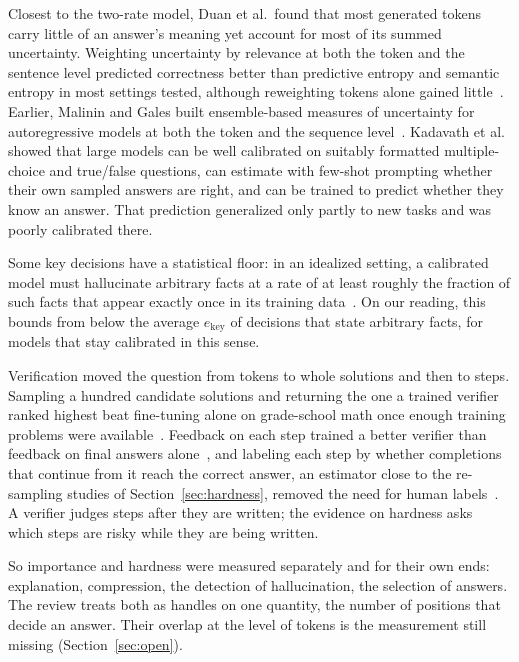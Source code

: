 \documentclass{ieeeaccess}
\begin{document}
Closest to the two-rate model, Duan et al.\ found that most generated tokens carry little of an answer's meaning yet account for most of its summed uncertainty. Weighting uncertainty by relevance at both the token and the sentence level predicted correctness better than predictive entropy and semantic entropy in most settings tested, although reweighting tokens alone gained little~\cite{duan2024shifting}. Earlier, Malinin and Gales built ensemble-based measures of uncertainty for autoregressive models at both the token and the sequence level~\cite{malinin2021uncertainty}. Kadavath et al.~\cite{kadavath2022language} showed that large models can be well calibrated on suitably formatted multiple-choice and true/false questions, can estimate with few-shot prompting whether their own sampled answers are right, and can be trained to predict whether they know an answer. That prediction generalized only partly to new tasks and was poorly calibrated there.

Some key decisions have a statistical floor: in an idealized setting, a calibrated model must hallucinate arbitrary facts at a rate of at least roughly the fraction of such facts that appear exactly once in its training data~\cite{kalai2024calibrated}. On our reading, this bounds from below the average $e_{\text{key}}$ of decisions that state arbitrary facts, for models that stay calibrated in this sense.

Verification moved the question from tokens to whole solutions and then to steps. Sampling a hundred candidate solutions and returning the one a trained verifier ranked highest beat fine-tuning alone on grade-school math once enough training problems were available~\cite{cobbe2021training}. Feedback on each step trained a better verifier than feedback on final answers alone~\cite{lightman2024lets}, and labeling each step by whether completions that continue from it reach the correct answer, an estimator close to the re-sampling studies of Section~\ref{sec:hardness}, removed the need for human labels~\cite{wang2024mathshepherd}. A verifier judges steps after they are written; the evidence on hardness asks which steps are risky while they are being written.

So importance and hardness were measured separately and for their own ends: explanation, compression, the detection of hallucination, the selection of answers. The review treats both as handles on one quantity, the number of positions that decide an answer. Their overlap at the level of tokens is the measurement still missing (Section~\ref{sec:open}).
\end{document}
